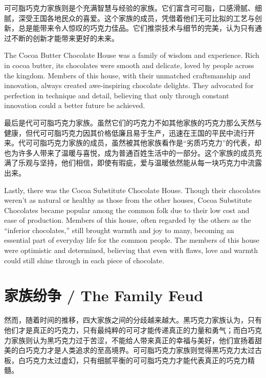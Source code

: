 可可脂巧克力家族则是个充满智慧与经验的家族。它们富含可可脂，口感滑腻、细腻，深受王国各地民众的喜爱。这个家族的成员，凭借着他们无可比拟的工艺与创新，总是能带来令人惊叹的巧克力佳品。它们推崇技术与细节的完美，认为只有通过不断的创新才能带来更好的未来。

\begin{flushright} The Cocoa Butter Chocolate House was a family of wisdom and experience. Rich in cocoa butter, its chocolates were smooth and delicate, loved by people across the kingdom. Members of this house, with their unmatched craftsmanship and innovation, always created awe-inspiring chocolate delights. They advocated for perfection in technique and detail, believing that only through constant innovation could a better future be achieved. \end{flushright}

最后是代可可脂巧克力家族。虽然它们的巧克力不如其他家族的巧克力那么天然与健康，但代可可脂巧克力因其价格低廉且易于生产，迅速在王国的平民中流行开来。代可可脂巧克力家族的成员，虽然被其他家族看作是“劣质巧克力”的代表，却也为许多人带来了温暖与喜悦，成为普通百姓生活中的一部分。这个家族的成员充满了乐观与坚持，他们相信，即使有瑕疵，爱与温暖依然能从每一块巧克力中流露出来。

\begin{flushright} Lastly, there was the Cocoa Substitute Chocolate House. Though their chocolates weren’t as natural or healthy as those from the other houses, Cocoa Substitute Chocolates became popular among the common folk due to their low cost and ease of production. Members of this house, often regarded by the others as the “inferior chocolates,” still brought warmth and joy to many, becoming an essential part of everyday life for the common people. The members of this house were optimistic and determined, believing that even with flaws, love and warmth could still shine through in each piece of chocolate. \end{flushright}

\section*{家族纷争 / The Family Feud}
然而，随着时间的推移，四大家族之间的分歧越来越大。黑巧克力家族认为，只有他们才是真正的巧克力，只有最纯粹的可可才能传递真正的力量和勇气；而白巧克力家族则认为黑巧克力过于苦涩，不能给人带来真正的幸福与美好，他们宣扬着甜美的白巧克力才是人类追求的至高境界。可可脂巧克力家族则觉得黑巧克力太过古板，白巧克力太过虚幻，只有细腻平衡的可可脂巧克力才能代表真正的巧克力精髓。

